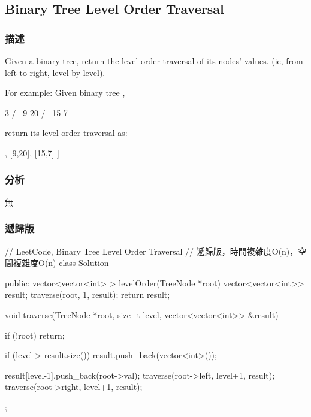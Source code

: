 \subsection{Binary Tree Level Order Traversal}
\label{sec:binary-tree-level-order-traversal}


\subsubsection{描述}
Given a binary tree, return the level order traversal of its nodes' values. (ie, from left to right, level by level).

For example:
Given binary tree ,
\begin{Code}
    3
   / \
  9  20
    /  \
   15   7
\end{Code}
return its level order traversal as:
\begin{Code}
[
  [3],
  [9,20],
  [15,7]
]
\end{Code}


\subsubsection{分析}
無


\subsubsection{遞歸版}
\begin{Code}
// LeetCode, Binary Tree Level Order Traversal
// 遞歸版，時間複雜度O(n)，空間複雜度O(n)
class Solution {
public:
    vector<vector<int> > levelOrder(TreeNode *root) {
        vector<vector<int>> result;
        traverse(root, 1, result);
        return result;
    }

    void traverse(TreeNode *root, size_t level, vector<vector<int>> &result) {
        if (!root) return;

        if (level > result.size())
            result.push_back(vector<int>());

        result[level-1].push_back(root->val);
        traverse(root->left, level+1, result);
        traverse(root->right, level+1, result);
    }
};
\end{Code}



